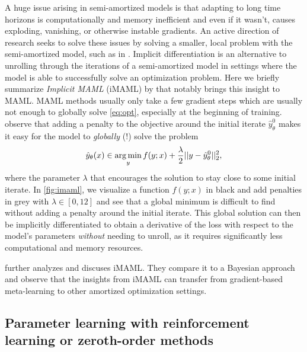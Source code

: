 \documentclass[twoside,11pt]{article}
\begin{document}
A huge issue arising in semi-amortized models is that adapting
to long time horizons is computationally and memory inefficient
and even if it wasn't, causes exploding, vanishing, or
otherwise instable gradients.
An active direction of research seeks to solve these issues by
solving a smaller, local problem with the semi-amortized model,
such as in \citet{chen2019modular,rajeswaran2019meta}.
Implicit differentiation is an alternative to unrolling through
the iterations of a semi-amortized model in settings where the
model is able to successfully solve an optimization problem.
Here we briefly summarize \emph{Implicit MAML} (iMAML) by \citet{rajeswaran2019meta}
that notably brings this insight to MAML.
MAML methods usually only take a few gradient steps which
are usually not enough to globally solve \cref{eq:opt},
especially at the beginning of training.
\citet{rajeswaran2019meta} observe that adding a penalty
to the objective around the initial iterate
$\hat y^0_\theta$ makes it easy for the model to
\emph{globally} (!) solve the problem
\begin{equation}
  \label{eq:iMAML}
  \hat y_\theta(x) \in \operatorname*{arg\,min}_y f(y; x) + \frac{\lambda}{2}||y-\hat y^0_\theta||_2^2,
\end{equation}
where the parameter $\lambda$ that encourages the
solution to stay close to some initial iterate.
In \cref{fig:imaml}, we visualize a function $f(y; x)$
in black and add penalties in grey with
$\lambda\in[0,12]$ and see that a global
minimum is difficult to find without adding a penalty
around the initial iterate.
This global solution can then be implicitly differentiated to obtain
a derivative of the loss with respect to the model's parameters
\emph{without} needing to unroll, as it requires
significantly less computational and memory resources.

\citet{huszar2019imaml} further analyzes and discuses iMAML.
They compare it to a Bayesian approach and observe that the insights
from iMAML can transfer from gradient-based meta-learning to
other amortized optimization settings.

\subsection{Parameter learning with reinforcement learning
  or zeroth-order methods}
\label{sec:learning:rl}
\end{document}
